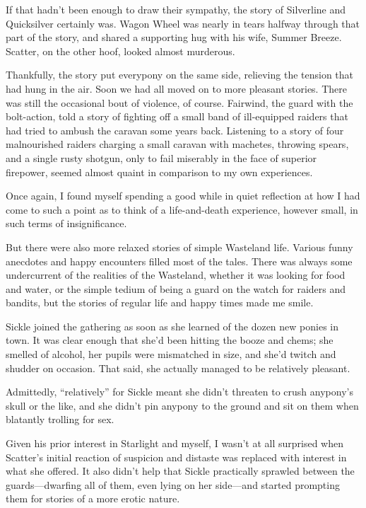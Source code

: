 If that hadn’t been enough to draw their sympathy, the story of Silverline and Quicksilver certainly was. Wagon Wheel was nearly in tears halfway through that part of the story, and shared a supporting hug with his wife, Summer Breeze. Scatter, on the other hoof, looked almost murderous.

Thankfully, the story put everypony on the same side, relieving the tension that had hung in the air. Soon we had all moved on to more pleasant stories. There was still the occasional bout of violence, of course. Fairwind, the guard with the bolt-action, told a story of fighting off a small band of ill-equipped raiders that had tried to ambush the caravan some years back. Listening to a story of four malnourished raiders charging a small caravan with machetes, throwing spears, and a single rusty shotgun, only to fail miserably in the face of superior firepower, seemed almost quaint in comparison to my own experiences.

Once again, I found myself spending a good while in quiet reflection at how I had come to such a point as to think of a life-and-death experience, however small, in such terms of insignificance.

But there were also more relaxed stories of simple Wasteland life. Various funny anecdotes and happy encounters filled most of the tales. There was always some undercurrent of the realities of the Wasteland, whether it was looking for food and water, or the simple tedium of being a guard on the watch for raiders and bandits, but the stories of regular life and happy times made me smile.

Sickle joined the gathering as soon as she learned of the dozen new ponies in town. It was clear enough that she’d been hitting the booze and chems; she smelled of alcohol, her pupils were mismatched in size, and she’d twitch and shudder on occasion. That said, she actually managed to be relatively pleasant.

Admittedly, “relatively” for Sickle meant she didn’t threaten to crush anypony’s skull or the like, and she didn’t pin anypony to the ground and sit on them when blatantly trolling for sex.

Given his prior interest in Starlight and myself, I wasn’t at all surprised when Scatter’s initial reaction of suspicion and distaste was replaced with interest in what she offered. It also didn’t help that Sickle practically sprawled between the guards—dwarfing all of them, even lying on her side—and started prompting them for stories of a more erotic nature.

